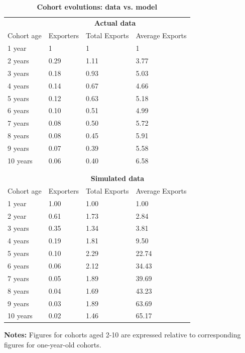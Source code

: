 \documentclass[12pt]{article}
\begin{document}
\begin{table}[tbp]
\caption{\textbf{Cohort evolutions: data vs. model}}
\label{tab:brooks_compare}\centering
{\small \ }
\par
{\small 
\begin{tabular}{llll}
\hline\hline
& \multicolumn{3}{l}{\ \ \ \ \ \ \ \ \ \ \ \ \ \textbf{Actual data}} \\ 
\cline{2-4}
Cohort age & Exporters & Total Exports & Average Exports \\ \hline
1 year & 1 & 1 & 1 \\ 
2 years & 0.29 & 1.11 & 3.77 \\ 
3 years & 0.18 & 0.93 & 5.03 \\ 
4 years & 0.14 & 0.67 & 4.66 \\ 
5 years & 0.12 & 0.63 & 5.18 \\ 
6 years & 0.10 & 0.51 & 4.99 \\ 
7 years & 0.08 & 0.50 & 5.72 \\ 
8 years & 0.08 & 0.45 & 5.91 \\ 
9 years & 0.07 & 0.39 & 5.58 \\ 
10 years & 0.06 & 0.40 & 6.58 \\ 
&  &  &  \\ 
&  &  &  \\ 
& \multicolumn{3}{l}{\ \ \ \ \ \ \ \ \ \ \ \ \textbf{Simulated data}} \\ 
\cline{2-4}
Cohort age & Exporters & Total Exports & Average Exports \\ \hline
1 year & 1.00 & 1.00 & 1.00 \\ 
2 year & 0.61 & 1.73 & 2.84 \\ 
3 years & 0.35 & 1.34 & 3.81 \\ 
4 years & 0.19 & 1.81 & 9.50 \\ 
5 years & 0.10 & 2.29 & 22.74 \\ 
6 years & 0.06 & 2.12 & 34.43 \\ 
7 years & 0.05 & 1.89 & 39.69 \\ 
8 years & 0.04 & 1.69 & 43.23 \\ 
9 years & 0.03 & 1.89 & 63.69 \\ 
10 years & 0.02 & 1.46 & 65.17 \\ \hline
\end{tabular}
}
\par
{\endcenter
\begin{tablenotes}
\item \textbf{Notes:} Figures for cohorts aged 2-10 are expressed relative to corresponding figures for one-year-old cohorts.
\end{tablenotes}
}
\end{table}
\end{document}
